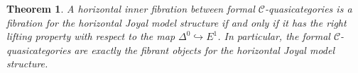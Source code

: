 \documentclass[leqno]{article}
\numberwithin{equation}{subsection}
\theoremstyle{plain}   %
\newtheorem{thm}[equation]{Theorem}
\newtheorem{prop}[equation]{Proposition}
\theoremstyle{remark}
\theoremstyle{plain}
\providecommand{\C}{}
\renewcommand{\C}{\ensuremath{\mathcal{C}}}
\begin{document}
\begin{thm}\label{isofibrations}
	A horizontal inner fibration between formal \(\C\)-quasicategories is a fibration for the horizontal Joyal model structure if and only if it has the right lifting property with respect to the map \(\Delta^0\hookrightarrow E^1\).  In particular, the formal \(\C\)-quasicategories are exactly the fibrant objects for the horizontal Joyal model structure.
\end{thm}
\begin{comment}
	\begin{prop}
	Given a necklace \(T\), there is a unique embedding \(\iota_T:T\hookrightarrow \Delta[T]\), where \(\Delta[T]\) is the unique representable whose spine is exactly the spine of \(T\).  This map sends the spine of \(T\) isomorphically onto the spine of \(\Delta[T]\) and is a horizontal inner anodyne.
	\end{prop}
\end{comment}
\end{document}
